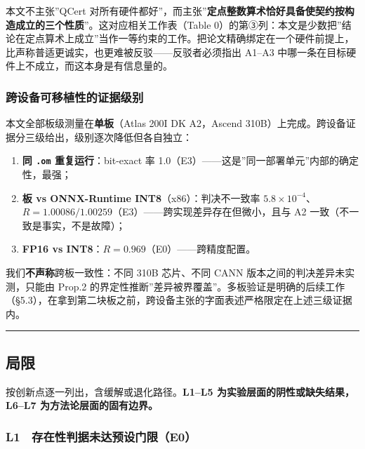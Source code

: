 本文不主张''QCert
对所有硬件都好''，而主张''\textbf{定点整数算术恰好具备使契约按构造成立的三个性质}''。这对应相关工作表（Table
0）的第③列：本文是少数把''结论在定点算术上成立''当作一等约束的工作。把论文精确绑定在一个硬件前提上，比声称普适更诚实，也更难被反驳------反驳者必须指出
A1--A3 中哪一条在目标硬件上不成立，而这本身是有信息量的。

\subsubsection{跨设备可移植性的证据级别}\label{ux8de8ux8bbeux5907ux53efux79fbux690dux6027ux7684ux8bc1ux636eux7ea7ux522b}

本文全部板级测量在\textbf{单板}（Atlas 200I DK A2，Ascend
310B）上完成。跨设备证据分三级给出，级别逐次降低但各自独立：

\begin{enumerate}
\def\labelenumi{\arabic{enumi}.}
\tightlist
\item
  \textbf{同 \texttt{.om} 重复运行}：bit-exact 率
  1.0（E3）------这是''同一部署单元''内部的确定性，最强；
\item
  \textbf{板 vs ONNX-Runtime INT8}（x86）：判决不一致率
  \(5.8{\times}10^{-4}\)、\(R=1.00086/1.00259\)（E3）------跨实现差异存在但微小，且与
  A2 一致（不一致是事实，不是故障）；
\item
  \textbf{FP16 vs INT8}：\(R=0.969\)（E0）------跨精度配置。
\end{enumerate}

我们\textbf{不声称}跨板一致性：不同 310B 芯片、不同 CANN
版本之间的判决差异未实测，只能由 Prop.2
的界定性推断''差异被界覆盖''。多板验证是明确的后续工作（§5.3），在拿到第二块板之前，跨设备主张的字面表述严格限定在上述三级证据内。

\begin{center}\rule{0.5\linewidth}{0.5pt}\end{center}

\subsection{局限}\label{ux5c40ux9650}

按创新点逐一列出，含缓解或退化路径。\textbf{L1--L5
为实验层面的阴性或缺失结果，L6--L7 为方法论层面的固有边界。}

\subsubsection{L1　存在性判据未达预设门限（E0）}\label{l1-ux5b58ux5728ux6027ux5224ux636eux672aux8fbeux9884ux8bbeux95e8ux9650e0}

